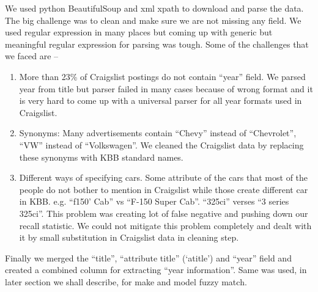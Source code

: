 \documentclass[dvips,11pt]{article}
\begin{document}
We used python BeautifulSoup and xml xpath to download and parse the data. The big challenge was to
clean and make sure we are not missing any field. We used regular expression in many places but
coming up with generic but meaningful regular expression for parsing was tough. Some of the
challenges that we faced are --


\begin{enumerate}
\item More than 23\% of Craigslist postings do not contain ``year'' field. We parsed year from title
  but parser failed in many cases because of wrong format and it is very hard to come up with a
  universal parser for all year formats used in Craigslist. 
\item Synonyms: Many advertisements contain ``Chevy'' instead of ``Chevrolet'', ``VW'' instead of
  ``Volkswagen''. We cleaned the Craigslist data by replacing these synonyms with KBB standard names.


\item Different ways of specifying cars. Some attribute of the cars that most of the people do not
  bother to mention in Craigslist while those create different car in KBB. e.g. ``f150' Cab'' vs
  ``F-150 Super Cab''. ``325ci'' verses ``3 series 325ci''. This problem was creating lot of false
  negative and pushing down our recall statistic. We could not mitigate this problem completely and
  dealt with it by small substitution in Craigslist data in cleaning step.
\end{enumerate}

Finally we merged the ``title'', ``attribute title'' (`atitle') and ``year'' field and created a combined column for extracting ``year information''. Same was used, in later section we shall describe, for make and model fuzzy match.
\end{document}
